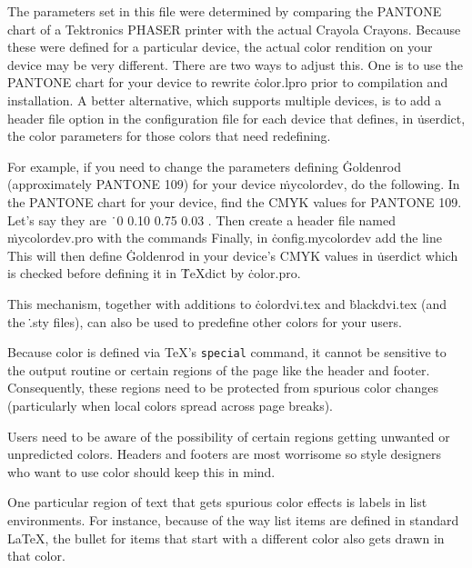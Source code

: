 The parameters set in this file were determined by comparing the
PANTONE chart of a Tektronics PHASER printer with the actual Crayola
Crayons.  Because these were defined for a particular device, the
actual color rendition on your device may be very different.  There
are two ways to adjust this.  One is to use the PANTONE chart for your
device to rewrite \.{color.lpro} prior to compilation and
installation.  A better alternative, which supports multiple devices,
is to add a header file option in the configuration file for each
device that defines, in \.{userdict}, the color parameters for those
colors that need redefining.

For example, if you need to change the parameters defining
\.{Goldenrod} (approximately PANTONE 109) for your device
\.{mycolordev}, do the following.  In the PANTONE chart for your
device, find the CMYK values for PANTONE 109.  Let's say they are
\.{\ 0 0.10 0.75 0.03 }. Then create a header file
named \.{mycolordev.pro} with the commands
\noindent
Finally, in \.{config.mycolordev} add the line 
\noindent
This will then define \.{Goldenrod} in your device's CMYK values in
\.{userdict} which is checked before defining it in \.{TeXdict} by
\.{color.pro}.

This mechanism, together with additions to \.{colordvi.tex} and
\.{blackdvi.tex} (and the \.{.sty} files), can also be used to predefine
other colors for your users.


Because color is defined via \TeX's {\tt\ttbackslash special} command,
it cannot be sensitive to the output routine or certain regions of the
page like the header and footer.  Consequently, these regions need to
be protected from spurious color changes (particularly when local
colors spread across page breaks).

Users need to be aware of the possibility of certain regions getting
unwanted or unpredicted colors.  Headers and footers are most
worrisome so style designers who want to use color should keep this in
mind.

One particular region of text that gets spurious color effects is
labels in list environments.  For instance, because of the way list
items are defined in standard La\TeX, the bullet for items that
start with a different color also gets drawn in that color.

